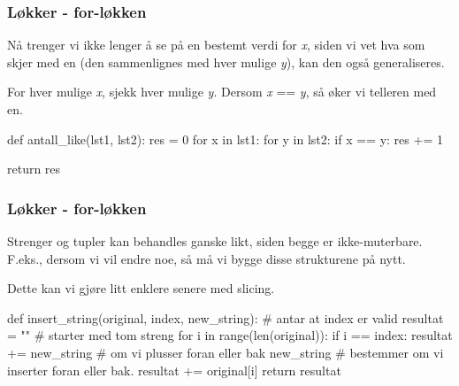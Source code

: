 \begin{frame}[fragile]
    \frametitle{Løkker - for-løkken}

    Nå trenger vi ikke lenger å se på en bestemt verdi for \textit{x}, siden vi vet hva som skjer med en (den sammenlignes med hver mulige \textit{y}), kan den også generaliseres. 

    For hver mulige \textit{x}, sjekk hver mulige \textit{y}. Dersom \textit{x} == \textit{y}, så øker vi telleren med en.

\begin{python}
def antall_like(lst1, lst2):
    res = 0
    for x in lst1: 
        for y in lst2:
            if x == y: 
                res += 1
    
    return res
\end{python}

\end{frame}

\begin{frame}[fragile]
    \frametitle{Løkker - for-løkken}

    Strenger og tupler kan behandles ganske likt, siden begge er ikke-muterbare. F.eks., dersom vi vil endre noe, så må vi bygge disse strukturene på nytt. 

    Dette kan vi gjøre litt enklere senere med slicing. 

\begin{python}
def insert_string(original, index, new_string):
    # antar at index er valid
    resultat = "" # starter med tom streng 
    for i in range(len(original)): 
        if i == index: 
            resultat += new_string 
        # om vi plusser foran eller bak new_string 
        # bestemmer om vi inserter foran eller bak. 
        resultat += original[i] 
    return resultat
\end{python}

\end{frame}












